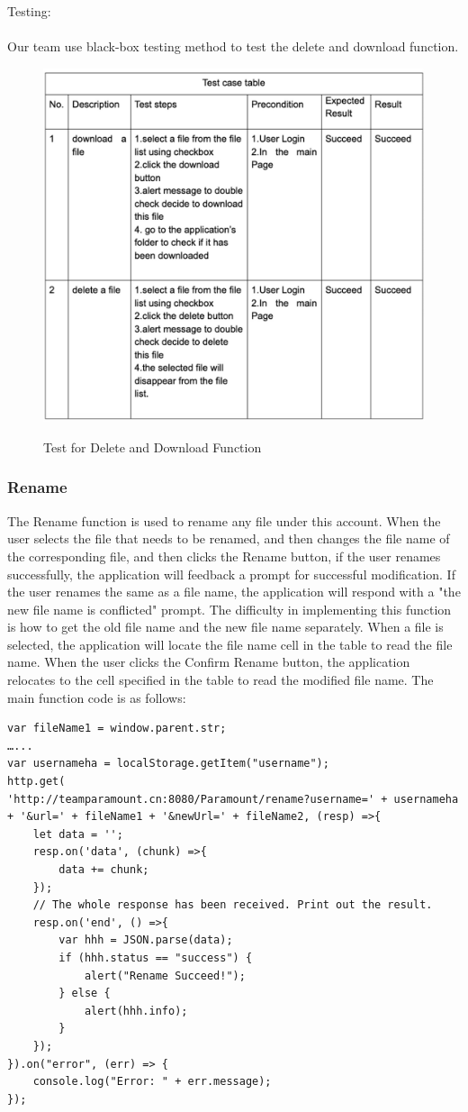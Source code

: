\documentclass[11pt]{article}
\begin{document}
Testing:
\\
\\
Our team use black-box testing method to test the delete and download function.
\begin{figure}[htbp]
	\centering
	\includegraphics[width=12cm]{5.png}\\
	\caption{Test for Delete and Download Function}
\end{figure}
	
\subsubsection{Rename}
The Rename function is used to rename any file under this account. When the user selects the file that needs to be renamed, and then changes the file name of the corresponding file, and then clicks the Rename button, if the user renames successfully, the application will feedback a prompt for successful modification. If the user renames the same as a file name, the application will respond with a "the new file name is conflicted" prompt. The difficulty in implementing this function is how to get the old file name and the new file name separately. When a file is selected, the application will locate the file name cell in the table to read the file name. When the user clicks the Confirm Rename button, the application relocates to the cell specified in the table to read the modified file name. The main function code is as follows:
\begin{lstlisting}
var fileName1 = window.parent.str;
…...
var usernameha = localStorage.getItem("username");
http.get(
'http://teamparamount.cn:8080/Paramount/rename?username=' + usernameha + '&url=' + fileName1 + '&newUrl=' + fileName2, (resp) =>{
	let data = '';
	resp.on('data', (chunk) =>{
		data += chunk;
	});
	// The whole response has been received. Print out the result.
	resp.on('end', () =>{
		var hhh = JSON.parse(data);
		if (hhh.status == "success") {
			alert("Rename Succeed!");
		} else {
			alert(hhh.info);
		}
	});
}).on("error", (err) => {
	console.log("Error: " + err.message);
});
\end{lstlisting}
\end{document}
